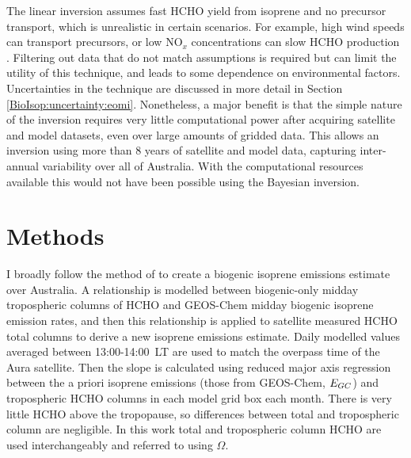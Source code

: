       
      
      The linear inversion assumes fast HCHO yield from isoprene and no precursor transport, which is unrealistic in certain scenarios.
      For example, high wind speeds can transport precursors, or low NO$_x$ concentrations can slow HCHO production \parencite{Palmer2006,Surl2018}.
      Filtering out data that do not match assumptions is required but can limit the utility of this technique, and leads to some dependence on environmental factors.
      Uncertainties in the technique are discussed in more detail in Section \ref{BioIsop:uncertainty:eomi}.
      Nonetheless, a major benefit is that the simple nature of the inversion requires very little computational power after acquiring satellite and model datasets, even over large amounts of gridded data.
      This allows an inversion using more than 8 years of satellite and model data, capturing inter-annual variability over all of Australia.
      With the computational resources available this would not have been possible using the Bayesian inversion.

\section{Methods}
  \label{BioIsop:method}
  
  
  I broadly follow the method of \textcite{Palmer2001} to create a biogenic isoprene emissions estimate over Australia.
  A relationship is modelled between biogenic-only midday tropospheric columns of HCHO and GEOS-Chem midday biogenic isoprene emission rates, and then this relationship is applied to satellite measured HCHO total columns to derive a new isoprene emissions estimate.
  Daily modelled values averaged between 13:00-14:00~LT are used to match the overpass time of the Aura satellite.
  Then the slope is calculated using reduced major axis regression between the a priori isoprene emissions (those from GEOS-Chem, $E_{GC}$) and tropospheric HCHO columns in each model grid box each month.
  There is very little HCHO above the tropopause, so differences between total and tropospheric column are negligible.
  In this work total and tropospheric column HCHO are used interchangeably and referred to using $\Omega$.
  
  
